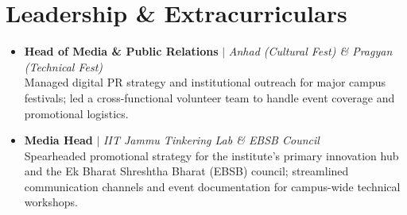 \documentclass[letterpaper,11pt]{article}
\newcommand{\resumeItem}[1]{
  \item\small{
    {#1 \vspace{-2pt}}
  }
}
\newcommand{\resumeItemListStart}{\begin{itemize}[itemsep=1pt, parseitemsep=1pt]}
\newcommand{\resumeItemListEnd}{\end{itemize}\vspace{-4pt}}
\begin{document}
\section*{Leadership \& Extracurriculars}
  \resumeItemListStart
    \resumeItem{\textbf{Head of Media \& Public Relations} $|$ \emph{Anhad (Cultural Fest) \& Pragyan (Technical Fest)} \\ Managed digital PR strategy and institutional outreach for major campus festivals; led a cross-functional volunteer team to handle event coverage and promotional logistics.}
    \resumeItem{\textbf{Media Head} $|$ \emph{IIT Jammu Tinkering Lab \& EBSB Council} \\ Spearheaded promotional strategy for the institute's primary innovation hub and the Ek Bharat Shreshtha Bharat (EBSB) council; streamlined communication channels and event documentation for campus-wide technical workshops.}
  \resumeItemListEnd
\end{document}
